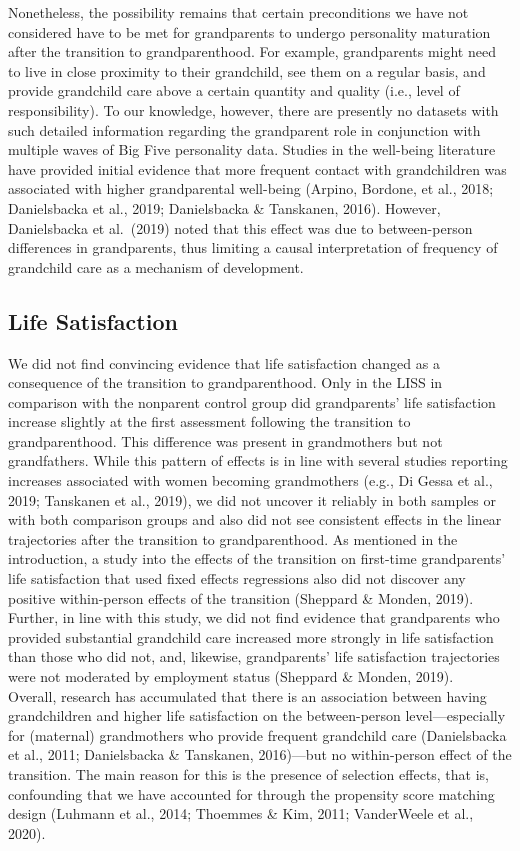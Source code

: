 \documentclass[
  english,
  man, noextraspace]{apa7}
\begin{document}
Nonetheless, the possibility remains that certain preconditions we have not considered have to be met for grandparents to undergo personality maturation after the transition to grandparenthood. For example, grandparents might need to live in close proximity to their grandchild, see them on a regular basis, and provide grandchild care above a certain quantity and quality (i.e., level of responsibility). To our knowledge, however, there are presently no datasets with such detailed information regarding the grandparent role in conjunction with multiple waves of Big Five personality data. Studies in the well-being literature have provided initial evidence that more frequent contact with grandchildren was associated with higher grandparental well-being (Arpino, Bordone, et al., 2018; Danielsbacka et al., 2019; Danielsbacka \& Tanskanen, 2016). However, Danielsbacka et al.~(2019) noted that this effect was due to between-person differences in grandparents, thus limiting a causal interpretation of frequency of grandchild care as a mechanism of development.

\hypertarget{life-satisfaction-2}{%
\subsection{Life Satisfaction}\label{life-satisfaction-2}}

We did not find convincing evidence that life satisfaction changed as a consequence of the transition to grandparenthood. Only in the LISS in comparison with the nonparent control group did grandparents' life satisfaction increase slightly at the first assessment following the transition to grandparenthood. This difference was present in grandmothers but not grandfathers. While this pattern of effects is in line with several studies reporting increases associated with women becoming grandmothers (e.g., Di Gessa et al., 2019; Tanskanen et al., 2019), we did not uncover it reliably in both samples or with both comparison groups and also did not see consistent effects in the linear trajectories after the transition to grandparenthood. As mentioned in the introduction, a study into the effects of the transition on first-time grandparents' life satisfaction that used fixed effects regressions also did not discover any positive within-person effects of the transition (Sheppard \& Monden, 2019). Further, in line with this study, we did not find evidence that grandparents who provided substantial grandchild care increased more strongly in life satisfaction than those who did not, and, likewise, grandparents' life satisfaction trajectories were not moderated by employment status (Sheppard \& Monden, 2019).\\
Overall, research has accumulated that there is an association between having grandchildren and higher life satisfaction on the between-person level---especially for (maternal) grandmothers who provide frequent grandchild care (Danielsbacka et al., 2011; Danielsbacka \& Tanskanen, 2016)---but no within-person effect of the transition. The main reason for this is the presence of selection effects, that is, confounding that we have accounted for through the propensity score matching design (Luhmann et al., 2014; Thoemmes \& Kim, 2011; VanderWeele et al., 2020).
\end{document}
